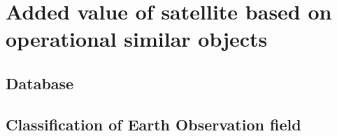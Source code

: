 
\bigskip
\section{Added value of satellite based on operational similar objects}
\label{added value}
\bigskip

\bigskip
\subsection{Database}
\bigskip


%

\bigskip
\subsection{Classification of Earth Observation field}
\bigskip




